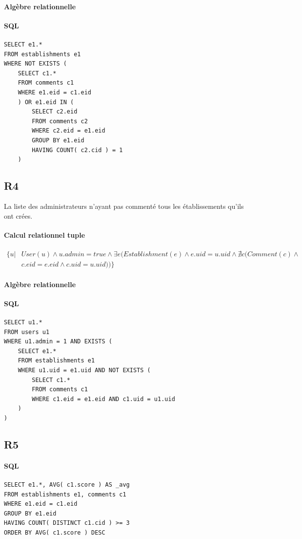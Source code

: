 \documentclass[11pt,a4paper]{report}
\begin{document}
\paragraph*{Algèbre relationnelle}
\paragraph*{SQL}
\begin{verbatim}
SELECT e1.*
FROM establishments e1
WHERE NOT EXISTS (
    SELECT c1.*
    FROM comments c1
    WHERE e1.eid = c1.eid
    ) OR e1.eid IN (
        SELECT c2.eid
        FROM comments c2
        WHERE c2.eid = e1.eid
        GROUP BY e1.eid
        HAVING COUNT( c2.cid ) = 1
    )
\end{verbatim}
\subsection*{R4}
La liste des administrateurs n’ayant pas commenté tous les établissements qu’ils ont crées.
\paragraph*{Calcul relationnel tuple}
\begin{align*}
\{ u|& User(u)  \wedge u.admin =true  \wedge \exists e (Establishment(e) \wedge e.uid = u.uid  \wedge \nexists c ( Comment(c) \wedge \\
& c.eid = e.eid \wedge c.uid = u.uid )) \} 
\end{align*}
\paragraph*{Algèbre relationnelle}
\paragraph*{SQL}
\begin{verbatim}
SELECT u1.*
FROM users u1
WHERE u1.admin = 1 AND EXISTS (
    SELECT e1.*
    FROM establishments e1
    WHERE u1.uid = e1.uid AND NOT EXISTS (
        SELECT c1.*
        FROM comments c1
        WHERE c1.eid = e1.eid AND c1.uid = u1.uid
    )
)
\end{verbatim}

\subsection*{R5}
\paragraph*{SQL}
\begin{verbatim}
SELECT e1.*, AVG( c1.score ) AS _avg
FROM establishments e1, comments c1
WHERE e1.eid = c1.eid 
GROUP BY e1.eid 
HAVING COUNT( DISTINCT c1.cid ) >= 3
ORDER BY AVG( c1.score ) DESC
\end{verbatim}
\end{document}
